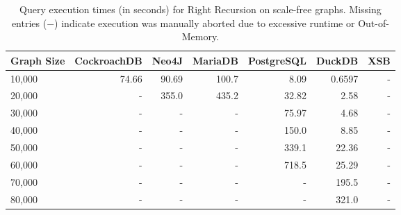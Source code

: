 \begin{table}[htpb]
\centering
\caption{Query execution times (in seconds) for Right Recursion on scale-free graphs. Missing entries ($-$) indicate execution was manually aborted due to excessive runtime or Out-of-Memory.}
\label{tab:scale_free_right_recursion}
\begin{tabular}{lrrrrrr}
\toprule
\textbf{Graph Size} & \textbf{CockroachDB} & \textbf{Neo4J} & \textbf{MariaDB} & \textbf{PostgreSQL} & \textbf{DuckDB} & \textbf{XSB} \\
\midrule
10,000 & 74.66 & 90.69 & 100.7 & 8.09 & 0.6597 & - \\
20,000 & - & 355.0 & 435.2 & 32.82 & 2.58 & - \\
30,000 & - & - & - & 75.97 & 4.68 & - \\
40,000 & - & - & - & 150.0 & 8.85 & - \\
50,000 & - & - & - & 339.1 & 22.36 & - \\
60,000 & - & - & - & 718.5 & 25.29 & - \\
70,000 & - & - & - & - & 195.5 & - \\
80,000 & - & - & - & - & 321.0 & - \\
\bottomrule
\end{tabular}
\end{table}
